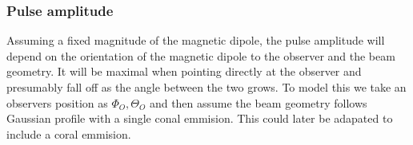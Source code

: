 \documentclass[/home/greg/Thesis/main/main.tex]{subfiles}
\begin{document}
%
%
%

\subsubsection{Pulse amplitude}
Assuming a fixed magnitude of the magnetic dipole, the pulse amplitude will 
depend on the orientation of the magnetic dipole to the observer and the
beam geometry. It will be 
maximal when pointing directly at the observer and presumably fall off as the
angle between the two grows. To model this we take an observers position as 
$\Phi_{O}, \Theta_{O}$ and then assume the beam geometry follows
Gaussian profile with a single conal emmision. This could later be adapated
to include a coral emmision.
\end{document}
